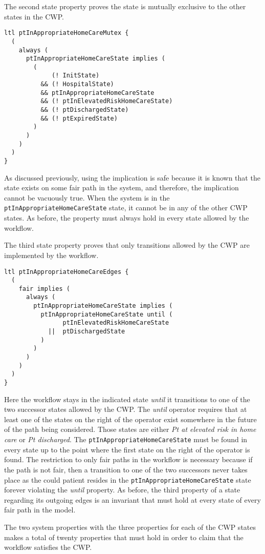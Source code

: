 The second state property proves the state is mutually exclusive to the other states in the CWP.
%
{\small
\begin{lstlisting}[style=myPromela]
ltl ptInAppropriateHomeCareMutex {
  ( 
    always (
      ptInAppropriateHomeCareState implies (
        (
             (! InitState)
          && (! HospitalState)
          && ptInAppropriateHomeCareState
          && (! ptInElevatedRiskHomeCareState)
          && (! ptDischargedState)
          && (! ptExpiredState)
        )
      )
    )
  )
}
\end{lstlisting}
}
%
\noindent As discussed previously, using the implication is safe because it is known that the state exists on some fair path in the system, and therefore, the implication cannot be vacuously true. When the system is in the \texttt{ptInAppropriateHomeCareState} state, it cannot be in any of the other CWP states. As before, the property must always hold in every state allowed by the workflow.

The third state property proves that only transitions allowed by the CWP are implemented by the workflow.
%
{\small
\begin{lstlisting}[style=myPromela]
ltl ptInAppropriateHomeCareEdges {
  (
    fair implies (
      always (
        ptInAppropriateHomeCareState implies (
          ptInAppropriateHomeCareState until (
                ptInElevatedRiskHomeCareState
            ||  ptDischargedState
          )
        )
      )
    )
  )
}
\end{lstlisting}
}
%
\noindent Here the workflow stays in the indicated state \emph{until} it transitions to one of the two successor states allowed by the CWP. The \emph{until} operator requires that at least one of the states on the right of the operator exist somewhere in the future of the path being considered. Those states are either \emph{Pt at elevated risk in home care} or \emph{Pt discharged}. The \texttt{ptInAppropriateHomeCareState} must be found in every state up to the point where the first state on the right of the operator is found. The restriction to only fair paths in the workflow is necessary because if the path is not fair, then a transition to one of the two successors never takes place as the could patient resides in the \texttt{ptInAppropriateHomeCareState} state forever violating the \emph{until} property. As before, the third property of a state regarding its outgoing edges is an invariant that must hold at every state of every fair path in the model. 

The two system properties with the three properties for each of the CWP states makes a total of twenty properties that must hold in order to claim that the workflow satisfies the CWP.